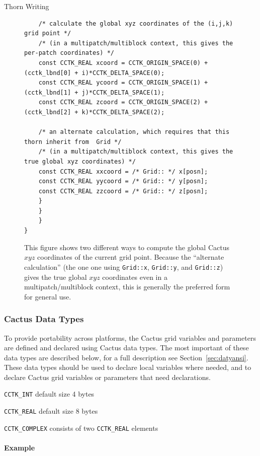 \begin{cactuspart}{Thorn Writing}
\begin{figure}[bp]
\begin{verbatim}
    /* calculate the global xyz coordinates of the (i,j,k) grid point */
    /* (in a multipatch/multiblock context, this gives the per-patch coordinates) */
    const CCTK_REAL xcoord = CCTK_ORIGIN_SPACE(0) + (cctk_lbnd[0] + i)*CCTK_DELTA_SPACE(0);
    const CCTK_REAL ycoord = CCTK_ORIGIN_SPACE(1) + (cctk_lbnd[1] + j)*CCTK_DELTA_SPACE(1);
    const CCTK_REAL zcoord = CCTK_ORIGIN_SPACE(2) + (cctk_lbnd[2] + k)*CCTK_DELTA_SPACE(2);

    /* an alternate calculation, which requires that this thorn inherit from  Grid */
    /* (in a multipatch/multiblock context, this gives the true global xyz coordinates) */
    const CCTK_REAL xxcoord = /* Grid:: */ x[posn];
    const CCTK_REAL yycoord = /* Grid:: */ y[posn];
    const CCTK_REAL zzcoord = /* Grid:: */ z[posn];
    }
    }
    }
}
\end{verbatim}
\caption{%
	This figure shows two different ways to compute the global
	Cactus $xyz$ coordinates of the current grid point.  Because
	the ``alternate calculation'' (the one one using \texttt{Grid::x},
	\texttt{Grid::y}, and \texttt{Grid::z}) gives the true global
	$xyz$ coordinates even in a multipatch/multiblock context,
	this is generally the preferred form for general use.
	}
\label{fig-global-xyz-coords}
\end{figure}

\subsubsection{Cactus Data Types}

To provide portability across platforms, the Cactus grid variables and parameters are defined and
declared using Cactus data types. The most important of
these data types are described below, for a full description
see Section~\ref{sec:datyansi}. These data types should
be used to declare local variables where needed, and to
declare Cactus grid variables or parameters that need
declarations.

\begin{Lentry}

\item[\texttt{CCTK\_INT}] default size 4 bytes
\item[\texttt{CCTK\_REAL}] default size 8 bytes
\item[\texttt{CCTK\_COMPLEX}] consists of two \texttt{CCTK\_REAL} elements

\end{Lentry}

\paragraph{Example}


\end{cactuspart}
